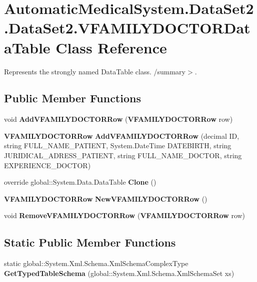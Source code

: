 \section{AutomaticMedicalSystem.DataSet2.DataSet2.VFAMILYDOCTORDataTable Class Reference}
\label{class_automatic_medical_system_1_1_data_set2_1_1_v_f_a_m_i_l_y_d_o_c_t_o_r_data_table}
Represents the strongly named DataTable class. /summary$>$.  


\subsection*{Public Member Functions}
\begin{CompactItemize}
\item 
void \textbf{AddVFAMILYDOCTORRow} ({\bf VFAMILYDOCTORRow} row)\label{class_automatic_medical_system_1_1_data_set2_1_1_v_f_a_m_i_l_y_d_o_c_t_o_r_data_table_06035d7aca15e109c9843b0a73e477f9}

\item 
{\bf VFAMILYDOCTORRow} \textbf{AddVFAMILYDOCTORRow} (decimal ID, string FULL\_\-NAME\_\-PATIENT, System.DateTime DATEBIRTH, string JURIDICAL\_\-ADRESS\_\-PATIENT, string FULL\_\-NAME\_\-DOCTOR, string EXPERIENCE\_\-DOCTOR)\label{class_automatic_medical_system_1_1_data_set2_1_1_v_f_a_m_i_l_y_d_o_c_t_o_r_data_table_e176b760b80c9358d2442f0b857d9b8c}

\item 
override global::System.Data.DataTable \textbf{Clone} ()\label{class_automatic_medical_system_1_1_data_set2_1_1_v_f_a_m_i_l_y_d_o_c_t_o_r_data_table_3d2c090cea0d436f61dfbb2158f08272}

\item 
{\bf VFAMILYDOCTORRow} \textbf{NewVFAMILYDOCTORRow} ()\label{class_automatic_medical_system_1_1_data_set2_1_1_v_f_a_m_i_l_y_d_o_c_t_o_r_data_table_aa71f5bfd77feec90efc926ba9dd6efe}

\item 
void \textbf{RemoveVFAMILYDOCTORRow} ({\bf VFAMILYDOCTORRow} row)\label{class_automatic_medical_system_1_1_data_set2_1_1_v_f_a_m_i_l_y_d_o_c_t_o_r_data_table_721884640377907acc04148deb0ee237}

\end{CompactItemize}
\subsection*{Static Public Member Functions}
\begin{CompactItemize}
\item 
static global::System.Xml.Schema.XmlSchemaComplexType \textbf{GetTypedTableSchema} (global::System.Xml.Schema.XmlSchemaSet xs)\label{class_automatic_medical_system_1_1_data_set2_1_1_v_f_a_m_i_l_y_d_o_c_t_o_r_data_table_4a8787623ae8bde9810d128af7718c50}

\end{CompactItemize}
